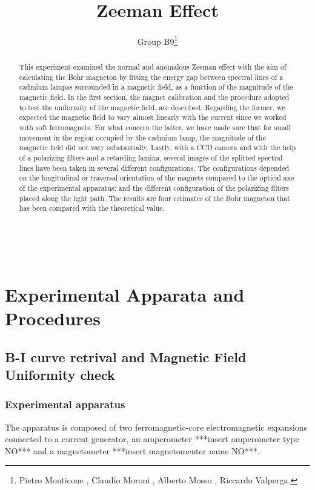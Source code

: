 \documentclass[a4paper,12pt,abstracton]{scrartcl}
\title{Zeeman Effect}
\author{Group B9\footnote{Pietro Monticone , Claudio Moroni , Alberto Mosso , Riccardo Valperga.}}
\begin{document}
\maketitle
\makenomenclature
\begin{abstract}
This experiment examined the normal and anomalous Zeeman effect with the aim of calculating the Bohr magneton by fitting the energy gap between spectral lines of a cadmium lampas surrounded in a magnetic field, as a function of the magnitude of the magnetic field. In the first section, the magnet calibration and the procedure adopted to test the uniformity of the magnetic field, are described. Regarding the former, we expected the magnetic field to vary almost linearly with the current since we worked with soft ferromagnets. For what concern the latter, we have made sure that for small movement in the region occupied by the cadmium lamp, the magnitude of the magnetic field did not vary substantially. Lastly, with a CCD camera and with the help of a polarizing filters and a retarding lamina, several images of the splitted spectral lines have been taken in several different configurations. The configurations depended on the longitudinal or traversal orientation of the magnets compared to the optical axe of the experimental apparatus; and the different configuration of the polarizing filters placed along the light path. The results are four estimates of the Bohr magneton that has been compared with the theoretical value.
\end{abstract}
\clearpage
\tableofcontents

\mbox{
}
\newpage
\section{Experimental Apparata and Procedures}
\subsection{B-I curve retrival and Magnetic Field Uniformity check}
\subsubsection{Experimental apparatus}
The apparatus is composed of two ferromagnetic-core electromagnetic expansions connected to a current generator, an amperometer ***insert amperometer type NO*** and a magnetometer ***insert magnetomenter name NO***.
\end{document}
